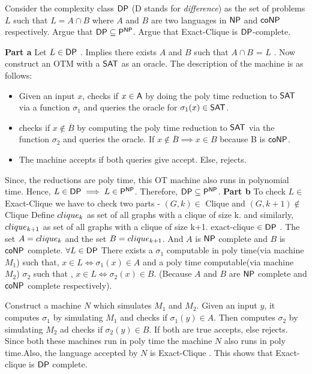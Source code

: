 \documentclass[12pt]{exam}
\begin{document}
\begin{questions}
\question
Consider the complexity class ${\mathsf{DP}}$ ({\sc D} stands for \textit{difference}) as the set of problems $L$ such that $L = A \cap B$ where $A$ and $B$ are two languages in ${\mathsf{NP}}$ and ${\mathsf{co}}{\mathsf{NP}}$ respectively. Argue that ${\mathsf{DP}} \subseteq {\ensuremath{\mathsf{P}}}^{{\mathsf{NP}}}$. Argue that {\sc Exact-Clique} is ${\mathsf{DP}}$-complete.

\begin{solution}
\textbf{Part a} \newline
  Let $L \in {\ensuremath{\mathsf{DP}}}$ . Implies there exists $A$ and $B$ such that $A \cap B$ = $L$ . Now construct an OTM with a ${\mathsf{SAT}}$ as an oracle.
  The description of the machine is as follows:
  \begin{itemize}
   \item Given an input $x$, checks if $x \in {\ensuremath{\mathsf{A}}}$ by doing the poly time reduction to ${\mathsf{SAT}}$ via a function $\sigma_{1}$ and queries the oracle 
   for $\sigma_{1}(x) \in {\ensuremath{\mathsf{SAT}}}$.
   \item checks if $x \notin \overline{B}$ by computing the poly time reduction to ${\mathsf{SAT}}$ via the function $\sigma_{2}$ and queries the oracle.
   If $x \notin \overline{B} \implies x \in B$ because B is ${\mathsf{co}}{\mathsf{NP}}$.
   \item The machine accepts if both queries give accept. Else, rejects.
  \end{itemize}
  Since, the reductions are poly time, this OT machine also runs in polynomial time. Hence, $L \in {\ensuremath{\mathsf{DP}}} \implies L \in {\ensuremath{\mathsf{P}}}^{{\mathsf{NP}}}$.
  Therefore, ${\mathsf{DP}} \subseteq {\ensuremath{\mathsf{P}}}^{{\mathsf{NP}}}$. \newline
\textbf{Part b} \newline  
   To check $L \in $ {\sc Exact-Clique} we have to check two parts - $(G,k) \in$ {\sc Clique} and $(G,k+1) \notin$ {\sc Clique} 
   Define ${\sc clique_{k}}$ as set of all graphs with a clique of size k. and similarly, ${\sc clique_{k+1}}$ as set of all graphs with a clique
   of size k+1.
   {\sc exact-clique} $\in {\ensuremath{\mathsf{DP}}}$ . The set $A = {\sc clique_{k}}$ and the set $B = {\sc clique_{k+1}}$. And $A$ is ${\mathsf{NP}}$ complete and $B$ is ${\mathsf{co}}{\mathsf{NP}}$ complete.
   \newline
   $\forall L \in {\ensuremath{\mathsf{DP}}}$
   There exists a $\sigma_{1}$ computable in poly time(via machine $M_{1}$) such that, $x \in L \Leftrightarrow \sigma_{1}(x) \in A$ and
   a poly time computable(via machine $M_{2}$) $\sigma_{2}$ such that , $x \in L \Leftrightarrow \sigma_{2}(x) \in B$. (Because $A$ and $B$ are ${\mathsf{NP}}$ complete and ${\mathsf{co}}{\mathsf{NP}}$ complete
   respectively). \newline
 
   Construct a machine $N$ which simulates $M_{1}$ and $M_{2}$.
   Given an input $y$, it computes $\sigma_{1}$ by simulating $M_{1}$ and checks if $\sigma_{1}(y) \in A$. \newline
   Then computes $\sigma_{2}$ by simulating $M_{2}$ ad checks if $\sigma_{2}(y) \in B$.\newline
   If both are true accepts, else rejects.\newline
   Since both these machines run in poly time the machine $N$ also runs in poly time.Also, the language accepted by $N$ is {\sc Exact-Clique} .
   This shows that {\sc Exact-clique} is ${\mathsf{DP}}$ complete.
  

\end{solution}
\end{questions}
\end{document}
